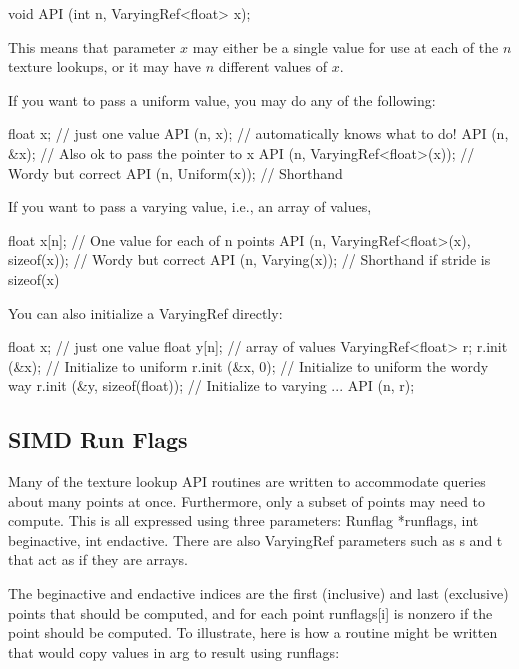 \begin{code}
        void API (int n, VaryingRef<float> x);
\end{code}

\noindent This means that parameter $x$ may either be a single value
for use at each of the $n$ texture lookups, or it may have $n$ different
values of $x$.  

If you want to pass a uniform value, you may do any of the following:

\begin{code}
      float x;   // just one value
      API (n, x);   // automatically knows what to do!
      API (n, &x);  // Also ok to pass the pointer to x
      API (n, VaryingRef<float>(x));  // Wordy but correct
      API (n, Uniform(x));  // Shorthand
\end{code}

If you want to pass a varying value, i.e., an array of values,

\begin{code}
      float x[n];   // One value for each of n points
      API (n, VaryingRef<float>(x), sizeof(x));  // Wordy but correct
      API (n, Varying(x));  // Shorthand if stride is sizeof(x)
\end{code}

You can also initialize a VaryingRef directly:

\begin{code}
    float x;     // just one value
    float y[n];  // array of values
    VaryingRef<float> r;
    r.init (&x);                 // Initialize to uniform
    r.init (&x, 0);              // Initialize to uniform the wordy way
    r.init (&y, sizeof(float));  // Initialize to varying
    ...
    API (n, r);
\end{code}


\subsection{SIMD Run Flags}

Many of the texture lookup API routines are written to accommodate
queries about many points at once.  Furthermore, only a subset of
points may need to compute.  This is all expressed using three
parameters:  {\cf Runflag *runflags, int beginactive, int endactive}.
There are also {\cf VaryingRef} parameters such as {\cf s} and {\cf t}
that act as if they are arrays.

The {\cf beginactive} and {\cf endactive} indices are the first
(inclusive) and
last (exclusive) points that should be computed, and for each point
{\cf runflags[i]} is nonzero if the point should be computed.  To
illustrate, here is how a routine might be written that would copy
values in {\cf arg} to {\cf result} using runflags:

